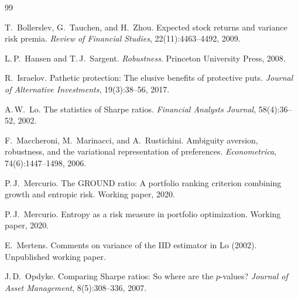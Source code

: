 \documentclass[11pt]{article}
\theoremstyle{definition}
\theoremstyle{remark}
\begin{document}

\begin{thebibliography}{99}

T.~Bollerslev, G.~Tauchen, and H.~Zhou.
\newblock Expected stock returns and variance risk premia.
\newblock \emph{Review of Financial Studies}, 22(11):4463--4492, 2009.

L.\,P.~Hansen and T.\,J.~Sargent.
\newblock \emph{Robustness}.
\newblock Princeton University Press, 2008.

R.~Israelov.
\newblock Pathetic protection: The elusive benefits of protective puts.
\newblock \emph{Journal of Alternative Investments}, 19(3):38--56, 2017.

A.\,W.~Lo.
\newblock The statistics of Sharpe ratios.
\newblock \emph{Financial Analysts Journal}, 58(4):36--52, 2002.

F.~Maccheroni, M.~Marinacci, and A.~Rustichini.
\newblock Ambiguity aversion, robustness, and the variational
representation of preferences.
\newblock \emph{Econometrica}, 74(6):1447--1498, 2006.

P.\,J.~Mercurio.
\newblock The GROUND ratio: A portfolio ranking criterion combining
growth and entropic risk.
\newblock Working paper, 2020.

P.\,J.~Mercurio.
\newblock Entropy as a risk measure in portfolio optimization.
\newblock Working paper, 2020.

E.~Mertens.
\newblock Comments on variance of the IID estimator in Lo (2002).
\newblock Unpublished working paper.

J.\,D.~Opdyke.
\newblock Comparing Sharpe ratios: So where are the $p$-values?
\newblock \emph{Journal of Asset Management}, 8(5):308--336, 2007.

\end{thebibliography}
\end{document}
